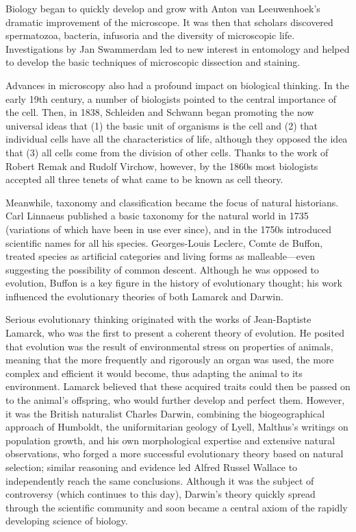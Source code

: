 \documentclass[
]{book}
\begin{document}
Biology began to quickly develop and grow with Anton van Leeuwenhoek's dramatic improvement of the microscope. It was then that scholars discovered spermatozoa, bacteria, infusoria and the diversity of microscopic life. Investigations by Jan Swammerdam led to new interest in entomology and helped to develop the basic techniques of microscopic dissection and staining.

Advances in microscopy also had a profound impact on biological thinking. In the early 19th century, a number of biologists pointed to the central importance of the cell. Then, in 1838, Schleiden and Schwann began promoting the now universal ideas that (1) the basic unit of organisms is the cell and (2) that individual cells have all the characteristics of life, although they opposed the idea that (3) all cells come from the division of other cells. Thanks to the work of Robert Remak and Rudolf Virchow, however, by the 1860s most biologists accepted all three tenets of what came to be known as cell theory.

Meanwhile, taxonomy and classification became the focus of natural historians. Carl Linnaeus published a basic taxonomy for the natural world in 1735 (variations of which have been in use ever since), and in the 1750s introduced scientific names for all his species. Georges-Louis Leclerc, Comte de Buffon, treated species as artificial categories and living forms as malleable---even suggesting the possibility of common descent. Although he was opposed to evolution, Buffon is a key figure in the history of evolutionary thought; his work influenced the evolutionary theories of both Lamarck and Darwin.

Serious evolutionary thinking originated with the works of Jean-Baptiste Lamarck, who was the first to present a coherent theory of evolution. He posited that evolution was the result of environmental stress on properties of animals, meaning that the more frequently and rigorously an organ was used, the more complex and efficient it would become, thus adapting the animal to its environment. Lamarck believed that these acquired traits could then be passed on to the animal's offspring, who would further develop and perfect them. However, it was the British naturalist Charles Darwin, combining the biogeographical approach of Humboldt, the uniformitarian geology of Lyell, Malthus's writings on population growth, and his own morphological expertise and extensive natural observations, who forged a more successful evolutionary theory based on natural selection; similar reasoning and evidence led Alfred Russel Wallace to independently reach the same conclusions. Although it was the subject of controversy (which continues to this day), Darwin's theory quickly spread through the scientific community and soon became a central axiom of the rapidly developing science of biology.
\end{document}
